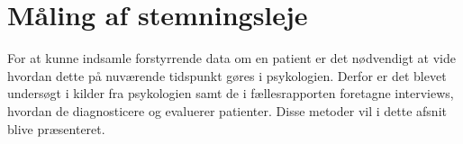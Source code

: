 \chapter{Måling af stemningsleje}\label{maaling_af_stemningsleje}
For at kunne indsamle forstyrrende data om en patient er det nødvendigt at vide hvordan dette på nuværende tidspunkt gøres i psykologien.
Derfor er det blevet undersøgt i kilder fra psykologien samt de i fællesrapporten foretagne interviews, hvordan de diagnosticere og evaluerer patienter. 
Disse metoder vil i dette afsnit blive præsenteret.

\label{PANAS}



